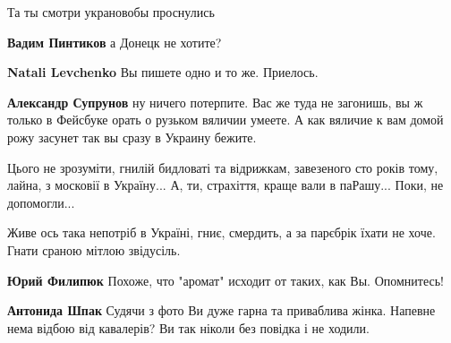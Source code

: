 Та ты смотри украновобы проснулись

\begin{itemize}

\textbf{Вадим Пинтиков} а Донецк не хотите?


\textbf{Natali Levchenko} Вы пишете одно и то же. Приелось.


\textbf{Александр Супрунов} ну ничего потерпите. Вас же туда не загонишь, вы ж только в Фейсбуке орать о рузьком вяличии умеете. А как вяличие к вам домой рожу засунет так вы сразу в Украину бежите.
\end{itemize}



Цього не зрозуміти, гнилій бидловаті та відрижкам, завезеного сто років тому,
лайна, з московії в Україну... А, ти, страхіття, краще вали в паРашу... Поки,
не допомогли...



Живе ось така непотріб в Україні, гниє, смердить, а за парєбрік їхати не хоче.
Гнати сраною мітлою звідусіль.

\begin{itemize}

\textbf{Юрий Филипюк} Похоже, что "аромат" исходит от таких, как Вы. Опомнитесь!


\textbf{Антонида Шпак} Судячи з фото Ви дуже гарна та приваблива жінка. Напевне нема відбою від кавалерів? Ви так ніколи без повідка і не ходили.
\end{itemize}

